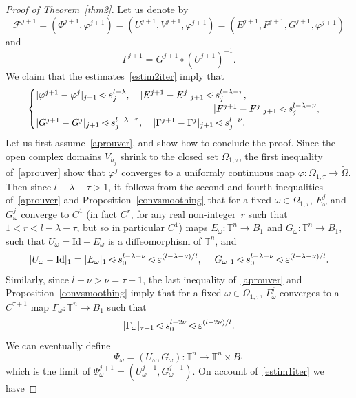 \documentclass[JEP,XML,SOM,Unicode]{cedram}
\let\mathcal\mathscr
\numberwithin{equation}{section}
\theoremstyle{plain}
\theoremstyle{definition}
\newcommand\T{\mathbb T}
\newcommand\MP{\,{<\hspace{-.5em}\cdot}\,}
\begin{document}
\begin{proof}[Proof of Theorem~\ref{thm2}]
Let us denote by
\[ \mathcal{F}^{j+1}=(\Phi^{j+1},\varphi^{j+1})=(U^{j+1},V^{j+1},\varphi^{j+1})=(E^{j+1},F^{j+1},G^{j+1},\varphi^{j+1}) \]
and
\[ \Gamma^{j+1}=G^{j+1} \circ (U^{j+1})^{-1}. \]
We claim that the estimates~\eqref{estim2iter} imply that
\begin{equation}\label{aprouver}
\begin{cases}
|\varphi^{j+1}-\varphi^j|_{j+1} \MP s_j^{l-\lambda}, \quad |E^{j+1}-E^j|_{j+1} \MP s_j^{l-\lambda-\tau}, \\
\hspace*{6.5cm} |F^{j+1}-F^j|_{j+1} \MP s_j^{l-\lambda-\nu}, \\
|G^{j+1}-G^j|_{j+1} \MP s_j^{l-\lambda-\tau}, \quad |\Gamma^{j+1}-\Gamma^j|_{j+1} \MP s_j^{l-\nu}.
\end{cases}
\end{equation}
Let us first assume~\eqref{aprouver}, and show how to conclude the proof. Since the open complex domains $V_{h_j}$ shrink to the closed set $\Omega_{1,\tau}$, the first inequality of~\eqref{aprouver} show that $\varphi^j$ converges to a uniformly continuous map $\varphi : \Omega_{1,\tau} \to \tilde{\Omega}$. Then since $l-\lambda-\tau>1$, it~follows from the second and fourth inequalities of~\eqref{aprouver} and Proposition~\ref{convsmoothing} that for a fixed $\omega \in \Omega_{1,\tau}$, $E_\omega^j$ and $G_\omega^j$ converge to $C^1$ (in fact $C^r$, for any real non-integer~$r$ such that $1<r<l-\lambda-\tau$, but so in particular $C^1$) maps $E_\omega : \T^n \to B_1$ and $G_\omega : \T^n \to B_1$, such that $U_\omega=\mathrm{Id}+E_\omega$ is a diffeomorphism of $\T^n$, and
\begin{equation}\label{est1}
|U_\omega-\mathrm{Id}|_1=|E_\omega|_1 \MP s_0^{l-\lambda-\nu} \MP \varepsilon^{(l-\lambda-\nu)/l}, \quad |G_\omega|_{1} \MP s_0^{l-\lambda-\nu} \MP \varepsilon^{(l-\lambda-\nu)/l}.
\end{equation}
Similarly, since $l-\nu>\nu=\tau+1$, the last inequality of~\eqref{aprouver} and Proposition~\ref{convsmoothing} imply that for a fixed $\omega \in \Omega_{1,\tau}$, $\Gamma_\omega^j$ converges to a $C^{\tau+1}$ map $\Gamma_\omega : \T^n \to B_1$ such that%
\begin{equation}\label{est2}
|\Gamma_\omega|_{\tau+1} \MP s_0^{l-2\nu} \MP \varepsilon^{(l-2\nu)/l}.
\end{equation}
We can eventually define
\[ \Psi_\omega=(U_\omega,G_\omega) : \T^n \to \T^n \times B_1 \]
which is the limit of $\Psi_\omega^{j+1}=(U_\omega^{j+1},G_\omega^{j+1})$. On account of~\eqref{estim1iter} we have

\end{proof}
\end{document}
